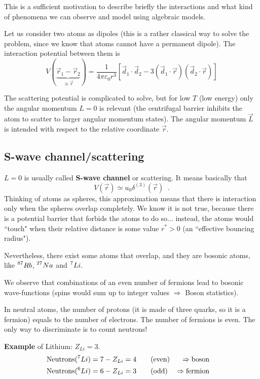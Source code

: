 \noindent This is a sufficient motivation to describe briefly the interactions and what kind of phenomena we can observe and model using algebraic models.

\vspace{1em}

Let us consider two atoms as dipoles (this is a rather classical way to solve the problem, since we know that atoms cannot have a permanent dipole).
The interaction potential between them is
\begin{equation*}
    V(\underbrace{\vec{r}_1-\vec{r}_2}_{\equiv\vec{r}}) = \frac{1}{4\pi\varepsilon_0r^3}
    \left[ \vec{d}_1\cdot \vec{d}_2 -3(\vec{d}_1\cdot\vec{r})(\vec{d}_2\cdot\vec{r})\right]
\end{equation*}

The scattering potential is complicated to solve, but for low $T$ (low energy) only the angular momentum $L=0$ is relevant (the centrifugal barrier inhibits the atom to scatter to larger angular momentum states). The angular momentum $\vec{L}$ is intended with respect to the relative coordinate $\vec{r}$.


\subsection{S-wave channel/scattering}

$L=0$ is usually called \textbf{S-wave channel} or scattering. It means basically that 
$$V(\vec{r}) \simeq u_0\delta^{(3)}(\vec{r}) \;\;.$$
Thinking of atoms as spheres, this approximation means that there is interaction only when the spheres overlap completely. We know it is not true, because there is a potential barrier that forbids the atoms to do so... instead, the atoms would ``touch" when their relative distance is some value $r^*>0$ (an ``effective bouncing radius").

Nevertheless, there exist some atoms that overlap, and they are bosonic atoms, like $\prescript{87}{}{Rb}$, $\prescript{27}{}{Na}$ and $\prescript{7}{}{Li}$.

We observe that combinations of an even number of fermions lead to bosonic wave-functions (spins would sum up to integer values $\Rightarrow$ Boson statistics).

In neutral atoms, the number of protons (it is made of three quarks, so it is a fermion) equals to the number of electrons. The number of fermions is even. The only way to discriminate is to count neutrons!

\noindent \textbf{Example} of Lithium: $Z_{Li} = 3$.
\begin{align*}
    \text{Neutrons}(\prescript{7}{}{Li}) = 7-Z_{Li} = 4 &\qquad \text{(even)} &\Rightarrow \text{boson}&&\\
    \text{Neutrons}(\prescript{6}{}{Li}) = 6-Z_{Li} = 3 &\qquad \text{(odd)} &\Rightarrow \text{fermion}&&
\end{align*}

